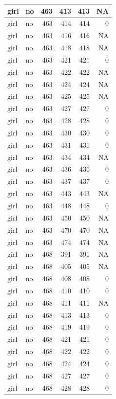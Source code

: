 \documentclass[man]{apa6}
\begin{document}
\begin{tabular}{l|l|r|r|r|r}
\hline
girl & no & 463 & 413 & 413 & NA\\
\hline
girl & no & 463 & 414 & 414 & 0\\
\hline
girl & no & 463 & 416 & 416 & NA\\
\hline
girl & no & 463 & 418 & 418 & NA\\
\hline
girl & no & 463 & 421 & 421 & 0\\
\hline
girl & no & 463 & 422 & 422 & NA\\
\hline
girl & no & 463 & 424 & 424 & NA\\
\hline
girl & no & 463 & 425 & 425 & NA\\
\hline
girl & no & 463 & 427 & 427 & 0\\
\hline
girl & no & 463 & 428 & 428 & 0\\
\hline
girl & no & 463 & 430 & 430 & 0\\
\hline
girl & no & 463 & 431 & 431 & 0\\
\hline
girl & no & 463 & 434 & 434 & NA\\
\hline
girl & no & 463 & 436 & 436 & 0\\
\hline
girl & no & 463 & 437 & 437 & 0\\
\hline
girl & no & 463 & 443 & 443 & NA\\
\hline
girl & no & 463 & 448 & 448 & 0\\
\hline
girl & no & 463 & 450 & 450 & NA\\
\hline
girl & no & 463 & 470 & 470 & NA\\
\hline
girl & no & 463 & 474 & 474 & NA\\
\hline
girl & no & 468 & 391 & 391 & NA\\
\hline
girl & no & 468 & 405 & 405 & NA\\
\hline
girl & no & 468 & 408 & 408 & 0\\
\hline
girl & no & 468 & 410 & 410 & 0\\
\hline
girl & no & 468 & 411 & 411 & NA\\
\hline
girl & no & 468 & 413 & 413 & 0\\
\hline
girl & no & 468 & 419 & 419 & 0\\
\hline
girl & no & 468 & 421 & 421 & 0\\
\hline
girl & no & 468 & 422 & 422 & 0\\
\hline
girl & no & 468 & 424 & 424 & 0\\
\hline
girl & no & 468 & 427 & 427 & 0\\
\hline
girl & no & 468 & 428 & 428 & 0\\

\end{tabular}
\end{document}
